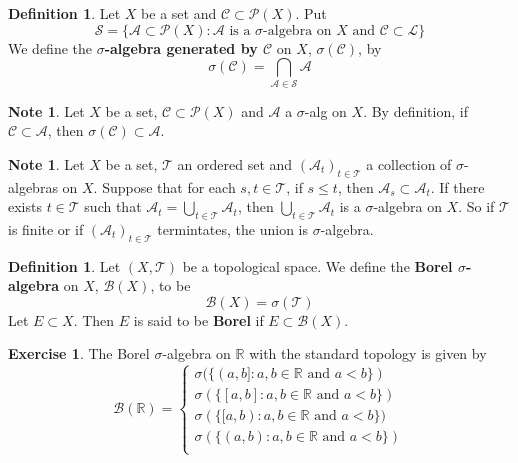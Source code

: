 \documentclass[12pt]{amsart}
\theoremstyle{definition}
\newtheorem{defn}[definition]{Definition}
\newtheorem{note}[definition]{Note}
\newtheorem{ex}[definition]{Exercise}
\newcommand{\sig}{\sigma}
\newcommand{\R}{\mathbb{R}}
\newcommand{\MA}{\mathcal{A}}
\newcommand{\MC}{\mathcal{C}}
\newcommand{\MB}{\mathcal{B}}
\newcommand{\ML}{\mathcal{L}}
\newcommand{\MS}{\mathcal{S}}
\newcommand{\MP}{\mathcal{P}}
\newcommand{\MT}{\mathcal{T}}
\newcommand{\lex}[1]{\label{ex:#1}}
\newcommand{\ld}[1]{\label{defn:#1}}
\begin{document}
	\begin{defn} \ld{00000} 
		Let $X$ be a set and $\MC \subset \MP(X)$. Put $$\MS = \{\MA \subset \MP(X): \MA \text{ is a }\sig\text{-algebra on }X \text{ and } \MC \subset \ML\}$$ We define the \textbf{$\sig$-algebra generated by $\MC$} on $X$, $\sig(\MC)$, by $$\sig(\MC) = \bigcap_{\MA \in \MS} \MA $$
	\end{defn}
	
	\begin{note}
		Let $X$ be a set, $\MC \subset \MP(X)$ and $\MA$ a $\sig$-alg on $X$. By definition, if $\MC \subset \MA$, then $\sig(\MC) \subset \MA$.
	\end{note}
	
	\begin{note}
		Let $X$ be a set, $\MT$ an ordered set and $(\MA_t)_{t\in \MT}$ a collection of $\sig$-algebras on $X$. Suppose that for each $s,t \in \MT$, if $s \leq t$, then $\MA_s \subset \MA_t$. If there exists $t \in \MT$ such that $\MA_t = \bigcup\limits_{t \in \MT}\MA_t$, then $\bigcup\limits_{t \in \MT}\MA_t$ is a $\sig$-algebra on $X$. So if $\MT$ is finite or if $(\MA_t)_{t \in \MT}$ termintates, the union is $\sig$-algebra.
	\end{note}
	
	\begin{defn} \ld{00000} 
		Let $(X,\MT)$ be a topological space. We define the \textbf{Borel $\sig$-algebra} on $X$, $\MB(X)$, to be  
		$$\MB(X) = \sig(\MT)$$  
		Let $E \subset X$. Then $E$ is said to be \textbf{Borel} if $E \subset \MB(X)$.
	\end{defn}
	
	\begin{ex} \lex{00000} 
		The Borel $\sigma$-algebra on $\R$ with the standard topology is given by 
		\[
		\MB(\R) =
		\begin{cases}
			\sig(\{(a,b]:a,b \in \R \text{ and } a<b\}) \\
			\sig(\{[a,b]:a,b \in \R \text{ and } a<b\}) \\
			\sig(\{[a,b):a,b \in \R \text{ and } a<b\}) \\
			\sig(\{(a,b):a,b \in \R \text{ and } a<b\}) \\
		\end{cases}
		\]
	\end{ex}
	
\end{document}
